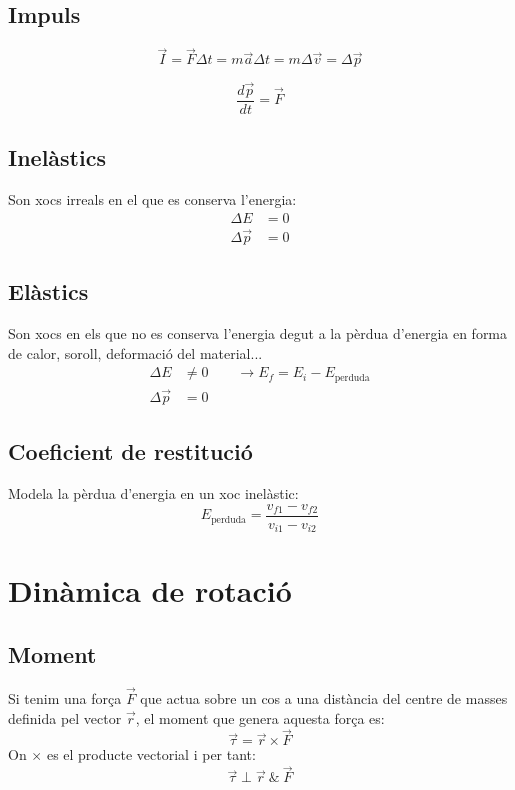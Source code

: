 \subsection{Impuls}
\begin{equation}
    \vec{I} = \vec{F}\Delta t = m \vec{a} \Delta t = m \Delta \vec{v} = \Delta \vec{p}
\end{equation}

\begin{equation}
    \frac{d\vec{p}}{dt} = \vec{F}
\end{equation}

\subsection{Inelàstics}
Son xocs irreals en el que es conserva l'energia:
\begin{align}
    \Delta E &= 0 \\
    \Delta \vec{p} &= 0
\end{align}



\subsection{Elàstics}
Son xocs en els que no es conserva l'energia degut a la pèrdua d'energia en forma de calor, soroll, deformació del material...
\begin{align}
    \Delta E &\neq 0 \qquad \rightarrow E_f = E_i - E_\text{perduda}\\
    \Delta \vec{p} &= 0
\end{align}

\subsection{Coeficient de restitució}
Modela la pèrdua d'energia en un xoc inelàstic:
\begin{equation}
    E_\text{perduda} = \frac{v_{f1}-v_{f2}}{v_{i1}-v_{i2}}
\end{equation}

\section{Dinàmica de rotació}
\subsection{Moment}
Si tenim una força $\vec{F}$ que actua sobre un cos a una distància del centre de masses definida pel vector $\vec{r}$, el moment que genera aquesta força es:
\begin{equation}
    \vec{\tau} = \vec{r} \times \vec{F}
\end{equation}
On $\times$ es el producte vectorial i per tant:
\begin{equation}
    \vec{\tau} \perp \vec{r}\ \&\ \vec{F}
\end{equation}

